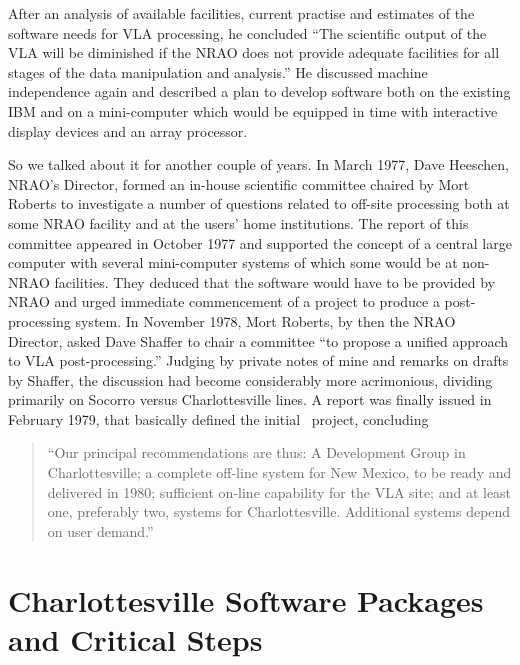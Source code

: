 After an analysis of available facilities, current practise and
estimates of the software needs for VLA processing, he concluded ``The
scientific output of the VLA will be diminished if the NRAO does not
provide adequate facilities for all stages of the data manipulation
and analysis.''  He discussed machine independence again and described
a plan to develop software both on the existing IBM and on a
mini-computer which would be equipped in time with interactive display
devices and an array processor.

So we talked about it for another couple of years.  In March 1977,
Dave Heeschen, NRAO's Director, formed an in-house scientific
committee chaired by Mort Roberts to investigate a number of
questions related to off-site processing both at some NRAO facility
and at the users' home institutions.  The report of this committee
appeared in October 1977 and supported the concept of a central large
computer with several mini-computer systems of which some would be at
non-NRAO facilities.  They deduced that the software would have to be
provided by NRAO and urged immediate commencement of a project to
produce a post-processing system.  In November 1978, Mort Roberts, by
then the NRAO Director, asked Dave Shaffer to chair a committee ``to
propose a unified approach to VLA post-processing.''  Judging by
private notes of mine and remarks on drafts by Shaffer, the discussion
had become considerably more acrimonious, dividing primarily on
Socorro versus Charlottesville lines.  A report was finally issued in
February 1979, that basically defined the initial \AIPS\ project,
concluding\vspace{-5pt}
\begin{quotation}
``Our principal recommendations are thus: A Development Group in
Charlottesville; a complete off-line system for New Mexico, to be
ready and delivered in 1980; sufficient on-line capability for the VLA
site; and at least one, preferably two, systems for Charlottesville.
Additional systems depend on user demand.''
\end{quotation}

\section{Charlottesville Software Packages and Critical Steps}

